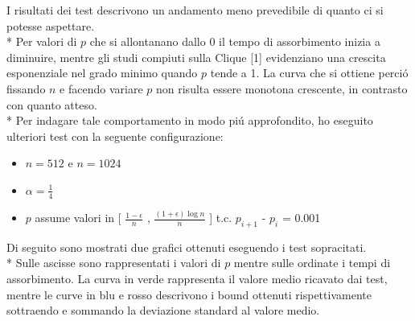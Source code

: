 \documentclass[../Tesi.tex]{subfiles}
\begin{document}
I risultati dei test descrivono un andamento meno prevedibile di quanto ci si potesse aspettare.\\*
Per valori di $p$ che si allontanano dallo 0 il tempo di assorbimento inizia a diminuire, mentre gli studi compiuti sulla Clique [1] evidenziano una crescita esponenziale nel grado minimo quando $p$ tende a 1. La curva che si ottiene perci\'o fissando $n$ e facendo variare $p$ non risulta essere monotona crescente, in contrasto con quanto atteso.\\*
Per indagare tale comportamento in modo pi\'u approfondito, ho eseguito ulteriori test con la seguente configurazione:
\begin{itemize}
    \item $n=512$ e $n=1024$
    \item $\alpha=\frac{1}{4}$
    \item $p$ assume valori in [ $\frac{1-\epsilon}{n}$ , $\frac{{(1+\epsilon)}\log{}n}{n}$ ] t.c. $p_{i+1}$ - $p_{i}$ = 0.001
\end{itemize}
Di seguito sono mostrati due grafici ottenuti eseguendo i test sopracitati.\\*
Sulle ascisse sono rappresentati i valori di $p$ mentre sulle ordinate i tempi di assorbimento. La curva in verde rappresenta il valore medio ricavato dai test, mentre le curve in blu e rosso descrivono i bound ottenuti rispettivamente sottraendo e sommando la deviazione standard al valore medio.
\end{document}

